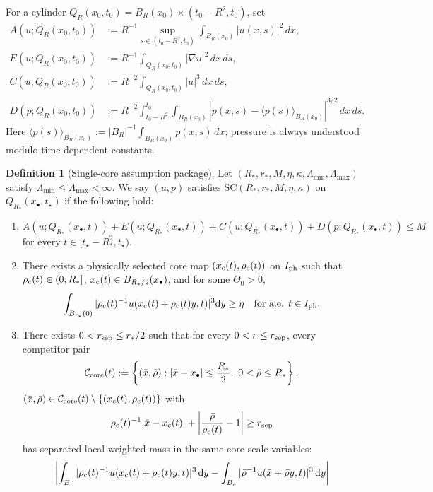 \documentclass[11pt]{amsart}
\theoremstyle{plain}
\theoremstyle{definition}
\newtheorem{definition}[theorem]{Definition}
\theoremstyle{remark}
\newcommand{\dd}{\mathrm d}
\begin{document}
For a cylinder \(Q_R(x_0,t_0)=B_R(x_0)\times (t_0-R^2,t_0)\), set
\[
\begin{aligned}
A(u;Q_R(x_0,t_0))&:=R^{-1}\sup_{s\in(t_0-R^2,t_0)}
\int_{B_R(x_0)}|u(x,s)|^2\,dx,\\
E(u;Q_R(x_0,t_0))&:=R^{-1}\int_{Q_R(x_0,t_0)}|\nabla u|^2\,dx\,ds,\\
C(u;Q_R(x_0,t_0))&:=R^{-2}\int_{Q_R(x_0,t_0)}|u|^3\,dx\,ds,\\
D(p;Q_R(x_0,t_0))&:=R^{-2}\int_{t_0-R^2}^{t_0}\int_{B_R(x_0)}
\left|p(x,s)-\langle p(s)\rangle_{B_R(x_0)}\right|^{3/2}\,dx\,ds.
\end{aligned}
\]
Here \(\langle p(s)\rangle_{B_R(x_0)}:=|B_R|^{-1}\int_{B_R(x_0)}p(x,s)\,dx\);
pressure is always understood modulo time-dependent constants.

\begin{definition}[Single-core assumption package]\label{def:SC}
Let \((R_*,r_*,M,\eta,\kappa,\Lambda_{\min},\Lambda_{\max})\) satisfy
\(\Lambda_{\min}\le \Lambda_{\max}<\infty\).
We say \((u,p)\) satisfies \(\mathrm{SC}(R_*,r_*,M,\eta,\kappa)\) on \(Q_{R_*}(x_\bullet,t_\star)\)
if the following hold:
\begin{enumerate}
\item[(\textup{SC1})] \(A(u;Q_{R_*}(x_\bullet,t)) + E(u;Q_{R_*}(x_\bullet,t))
  + C(u;Q_{R_*}(x_\bullet,t)) + D(p;Q_{R_*}(x_\bullet,t))\le M\) for every
  \(t\in[t_\star-R_*^2,t_\star)\).
\item[(\textup{SC2})] There exists a physically selected core map
  \((x_{\rm c}(t),\rho_{\rm c}(t))\) on \(I_{\rm ph}\) such that
  \(\rho_{\rm c}(t)\in(0,R_*]\), \(x_{\rm c}(t)\in B_{R_*/2}(x_\bullet)\), and for some
  \(\Theta_0>0\),
  \[
  \int_{B_{r_*}(0)}|\rho_{\rm c}(t)^{-1}u(x_{\rm c}(t)+\rho_{\rm c}(t)y,t)|^3\dd y\ge \eta
  \quad \text{for a.e. }t\in I_{\rm ph}.
  \]
\item[(\textup{SC3})] There exists \(0<r_{\rm sep}\le r_*/2\) such that for every
  \(0<r\le r_{\rm sep}\), every competitor pair
  \[
  \mathcal C_{\rm core}(t):=\left\{(\bar x,\bar\rho):|\bar x-x_\bullet|\le \frac{R_*}{2},\
  0<\bar\rho\le R_*\right\},
  \]
  \((\bar x,\bar\rho)\in \mathcal C_{\rm core}(t)\setminus\{(x_{\rm c}(t),\rho_{\rm c}(t))\}\)
  with
  \[
  \rho_{\rm c}(t)^{-1}|\bar x-x_{\rm c}(t)|
  +\left|\frac{\bar\rho}{\rho_{\rm c}(t)}-1\right|\ge r_{\rm sep}
  \]
  has separated local weighted mass in the same core-scale variables:
  \[
  \left|\int_{B_r}|\rho_{\rm c}(t)^{-1}u(x_{\rm c}(t)+\rho_{\rm c}(t)y,t)|^3\,\dd y
  - \int_{B_r}|\bar\rho^{-1}u(\bar x+\bar\rho y,t)|^3\,\dd y\right|
\]
\end{enumerate}
\end{definition}
\end{document}

